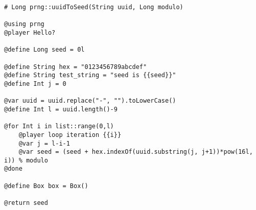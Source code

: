 \documentclass{article}
\begin{document}
\begin{verbatim}
# Long prng::uuidToSeed(String uuid, Long modulo)

@using prng
@player Hello?

@define Long seed = 0l

@define String hex = "0123456789abcdef"
@define String test_string = "seed is {{seed}}"
@define Int j = 0

@var uuid = uuid.replace("-", "").toLowerCase()
@define Int l = uuid.length()-9

@for Int i in list::range(0,l)
    @player loop iteration {{i}}
    @var j = l-i-1
    @var seed = (seed + hex.indexOf(uuid.substring(j, j+1))*pow(16l, i)) % modulo
@done

@define Box box = Box()

@return seed
\end{verbatim}
\end{document}
